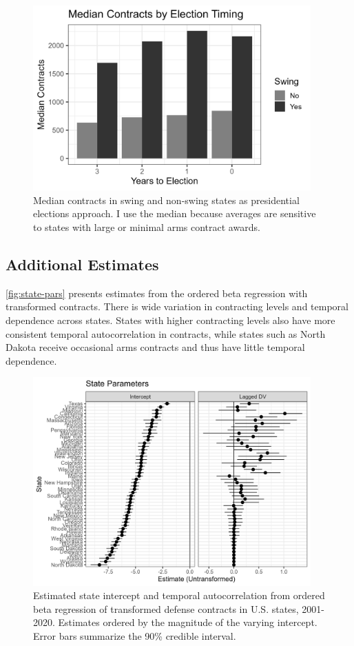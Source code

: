 \documentclass[12pt]{article}
\begin{document}
\begin{figure}[htpb]
	\centering
		\includegraphics[width=0.95\textwidth]{cont-swing-raw.png}
	\caption{Median contracts in swing and non-swing states as presidential elections approach. I use the median because averages are sensitive to states with large or minimal arms contract awards. }
	\label{fig:cont-swing-raw}
\end{figure}


\subsection{Additional Estimates}


\autoref{fig:state-pars} presents estimates from the ordered beta regression with transformed contracts. 
There is wide variation in contracting levels and temporal dependence across states. 
States with higher contracting levels also have more consistent temporal autocorrelation in contracts, while states such as North Dakota receive occasional arms contracts and thus have little temporal dependence. 

\begin{figure}[htpb]
	\centering
		\includegraphics[width=0.95\textwidth]{state-pars.png}
	\caption{Estimated state intercept and temporal autocorrelation from ordered beta regression of transformed defense contracts in U.S. states, 2001-2020. Estimates ordered by the magnitude of the varying intercept. Error bars summarize the 90\% credible interval.}
	\label{fig:state-pars}
\end{figure}
\end{document}

